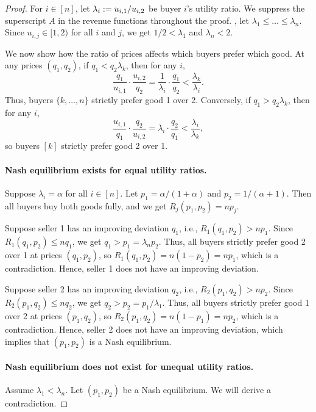 \begin{proof}
For $i \in [n]$, let $\lambda_i := u_{i,1} / u_{i,2}$ be buyer $i$'s utility ratio.
We suppress the superscript $A$ in the revenue functions throughout the proof.
\WLoG, let $\lambda_1 \le \ldots \le \lambda_n$.
Since $u_{i,j} \in [1, 2)$ for all $i$ and $j$, we get $1 / 2 < \lambda_1$ and $\lambda_n < 2$.

We now show how the ratio of prices affects which buyers prefer which good.
At any prices $(q_1, q_2)$, if $q_1 < q_2 \lambda_k$, then for any $i$,
\[ \frac{q_1}{u_{i,1}} \cdot \frac{u_{i,2}}{q_2} = \frac{1}{\lambda_i} \cdot \frac{q_1}{q_2} < \frac{\lambda_k}{\lambda_i}. \]
Thus, buyers $\{k, \ldots, n\}$ strictly prefer good 1 over 2.
Conversely, if $q_1 > q_2 \lambda_k$, then for any $i$,
\[ \frac{u_{i,1}}{q_1} \cdot \frac{q_2}{u_{i,2}} = \lambda_i \cdot \frac{q_2}{q_1} < \frac{\lambda_i}{\lambda_k}, \]
so buyers $[k]$ strictly prefer good 2 over 1.

\paragraph{Nash equilibrium exists for equal utility ratios.}
Suppose $\lambda_i = \alpha$ for all $i \in [n]$.
Let $p_1 = \alpha / (1 + \alpha)$ and $p_2 = 1 / (\alpha + 1)$.
Then all buyers buy both goods fully, and we get $R_j(p_1, p_2) = n p_j$.

Suppose seller 1 has an improving deviation $q_1$, i.e., $R_1(q_1, p_2) > n p_1$.
Since $R_1(q_1, p_2) \le n q_1$, we get $q_1 > p_1 = \lambda_n p_2$.
Thus, all buyers strictly prefer good 2 over 1 at prices $(q_1, p_2)$,
so $R_1(q_1, p_2) = n (1 - p_2) = n p_1$, which is a contradiction.
Hence, seller 1 does not have an improving deviation.

Suppose seller 2 has an improving deviation $q_2$, i.e., $R_2(p_1, q_2) > n p_2$.
Since $R_2(p_1, q_2) \le n q_2$, we get $q_2 > p_2 = p_1 / \lambda_1$.
Thus, all buyers strictly prefer good 1 over 2 at prices $(p_1, q_2)$,
so $R_2(p_1, q_2) = n (1 - p_1) = n p_2$, which is a contradiction.
Hence, seller 2 does not have an improving deviation,
which implies that $(p_1, p_2)$ is a Nash equilibrium.

\paragraph{Nash equilibrium does not exist for unequal utility ratios.}
Assume $\lambda_1 < \lambda_n$. Let $(p_1, p_2)$ be a Nash equilibrium.
We will derive a contradiction.


\end{proof}
